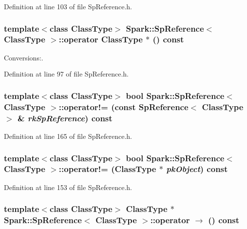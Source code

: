 Definition at line 103 of file Sp\-Reference.h.
\subsubsection{\setlength{\rightskip}{0pt plus 5cm}template$<$class Class\-Type$>$ {\bf Spark::Sp\-Reference}$<$ Class\-Type $>$::operator Class\-Type $\ast$ () const}\label{classSpark_1_1SpReference_a3}


Conversions:. 

Definition at line 97 of file Sp\-Reference.h.
\subsubsection{\setlength{\rightskip}{0pt plus 5cm}template$<$class Class\-Type$>$ bool {\bf Spark::Sp\-Reference}$<$ Class\-Type $>$::operator!= (const {\bf Sp\-Reference}$<$ Class\-Type $>$ \& {\em rk\-Sp\-Reference}) const}\label{classSpark_1_1SpReference_a11}


Definition at line 165 of file Sp\-Reference.h.
\subsubsection{\setlength{\rightskip}{0pt plus 5cm}template$<$class Class\-Type$>$ bool {\bf Spark::Sp\-Reference}$<$ Class\-Type $>$::operator!= (Class\-Type $\ast$ {\em pk\-Object}) const}\label{classSpark_1_1SpReference_a9}


Definition at line 153 of file Sp\-Reference.h.
\subsubsection{\setlength{\rightskip}{0pt plus 5cm}template$<$class Class\-Type$>$ Class\-Type $\ast$ {\bf Spark::Sp\-Reference}$<$ Class\-Type $>$::operator $\rightarrow$  () const}\label{classSpark_1_1SpReference_a5}


